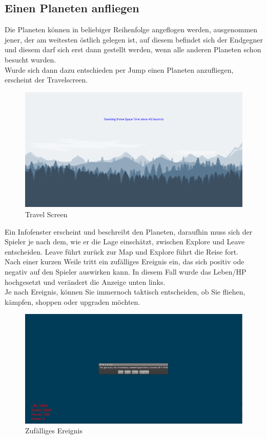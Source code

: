 \documentclass[fontsize=12pt,paper=a4,twoside]{scrartcl}
\begin{document}
\subsection{Einen Planeten anfliegen}
Die Planeten können in beliebiger Reihenfolge angeflogen werden, ausgenommen jener, der am weitesten östlich gelegen ist, auf diesem befindet sich der Endgegner und diesem darf sich erst dann gestellt werden, wenn alle anderen Planeten schon besucht wurden.\\
Wurde sich dann dazu entschieden per Jump einen Planeten anzufliegen, erscheint der Travelscreen.
\begin{figure}[htp]
	\centering
	\includegraphics[width=1.00\linewidth]{pics/travelScreen.png}
	\caption{Travel Screen}
	\label{fig1}
\end{figure}
Ein Infofenster erscheint und beschreibt den Planeten, daraufhin muss sich der Spieler je nach dem, wie er die Lage einschätzt, zwischen Explore und Leave entscheiden. Leave führt zurück zur Map und Explore führt die Reise fort.\\
Nach einer kurzen Weile tritt ein zufälliges Ereignis ein, das sich positiv ode negativ auf den Spieler auswirken kann. In diesem Fall wurde das Leben/HP hochgesetzt und verändert die Anzeige unten links.\\
Je nach Ereignis, können Sie immernoch taktisch entscheiden, ob Sie fliehen, kämpfen, shoppen oder upgraden möchten.

\begin{figure}[htp]
	\centering
	\includegraphics[width=1.00\linewidth]{pics/randomEreignis.png}
	\caption{Zufälliges Ereignis}
	\label{fig1}
\end{figure}
\end{document}
